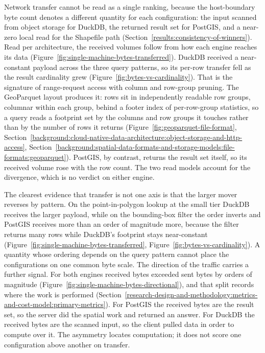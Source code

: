 Network transfer cannot be read as a single ranking, because the host-boundary byte count denotes a different quantity for each configuration: the input scanned from object storage for DuckDB, the returned result set for PostGIS, and a near-zero local read for the Shapefile path (Section~\ref{results:consistency-of-winners}). Read per architecture, the received volumes follow from how each engine reaches its data (Figure~\ref{fig:single-machine-bytes-transferred}). DuckDB received a near-constant payload across the three query patterns, so its per-row transfer fell as the result cardinality grew (Figure~\ref{fig:bytes-vs-cardinality}). That is the signature of range-request access with column and row-group pruning. The GeoParquet layout produces it: rows sit in independently readable row groups, columnar within each group, behind a footer index of per-row-group statistics, so a query reads a footprint set by the columns and row groups it touches rather than by the number of rows it returns \parencite{ogc2024_geoparquet_specification_v110,lamb2022_querying_parquet_millisecond_latency,maso2023_ogc_cog_standard,fielding2022_rfc9110_http_semantics,duckdb2025_parquet_overview} (Figure~\ref{fig:geoparquet-file-format}, Section~\ref{background:cloud-native-data-architecture:object-storage-and-http-access}, Section~\ref{background:spatial-data-formats-and-storage-models:file-formats:geoparquet}). PostGIS, by contrast, returns the result set itself, so its received volume rose with the row count. The two read models account for the divergence, which is no verdict on either engine.

The clearest evidence that transfer is not one axis is that the larger mover reverses by pattern. On the point-in-polygon lookup at the small tier DuckDB receives the larger payload, while on the bounding-box filter the order inverts and PostGIS receives more than an order of magnitude more, because the filter returns many rows while DuckDB's footprint stays near-constant (Figure~\ref{fig:single-machine-bytes-transferred}, Figure~\ref{fig:bytes-vs-cardinality}). A quantity whose ordering depends on the query pattern cannot place the configurations on one common byte scale. The direction of the traffic carries a further signal. For both engines received bytes exceeded sent bytes by orders of magnitude (Figure~\ref{fig:single-machine-bytes-directional}), and that split records where the work is performed (Section~\ref{research-design-and-methodology:metrics-and-cost-model:primary-metrics}). For PostGIS the received bytes are the result set, so the server did the spatial work and returned an answer. For DuckDB the received bytes are the scanned input, so the client pulled data in order to compute over it. The asymmetry locates computation; it does not score one configuration above another on transfer.

